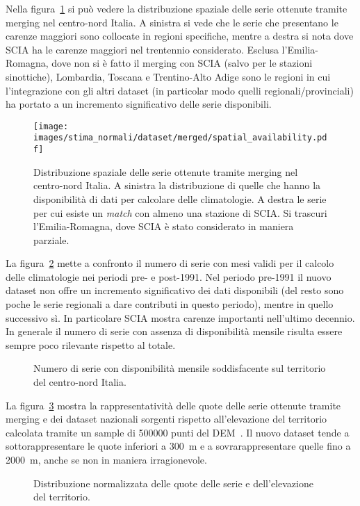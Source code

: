 Nella figura~\ref{fig:merged-series} si può vedere la distribuzione spaziale delle serie ottenute tramite merging nel centro-nord Italia. A sinistra si vede che le serie che presentano le carenze maggiori sono collocate in regioni specifiche, mentre a destra si nota dove SCIA ha le carenze maggiori nel trentennio considerato. Esclusa l'Emilia-Romagna, dove non si è fatto il merging con SCIA (salvo per le stazioni sinottiche), Lombardia, Toscana e Trentino-Alto Adige sono le regioni in cui l'integrazione con gli altri dataset (in particolar modo quelli regionali/provinciali) ha portato a un incremento significativo delle serie disponibili.
\begin{figure}[ht]
  \centering
  \texttt{[image: images/stima\_normali/dataset/merged/spatial\_availability.pdf]}
  \caption{Distribuzione spaziale delle serie ottenute tramite merging nel centro-nord Italia. A sinistra la distribuzione di quelle che hanno la disponibilità di dati per calcolare delle climatologie. A destra le serie per cui esiste un \emph{match} con almeno una stazione di SCIA. Si trascuri l'Emilia-Romagna, dove SCIA è stato considerato in maniera parziale.}\label{fig:merged-series}
\end{figure}

La figura~\ref{fig:merged-timeseries} mette a confronto il numero di serie con mesi validi per il calcolo delle climatologie nei periodi pre- e post-1991. Nel periodo pre-1991 il nuovo dataset non offre un incremento significativo dei dati disponibili (del resto sono poche le serie regionali a dare contributi in questo periodo), mentre in quello successivo sì. In particolare SCIA mostra carenze importanti nell'ultimo decennio. In generale il numero di serie con assenza di disponibilità mensile risulta essere sempre poco rilevante rispetto al totale.
\begin{figure}[ht]
  \centering
  
  \caption{Numero di serie con disponibilità mensile soddisfacente sul territorio del centro-nord Italia.}\label{fig:merged-timeseries}
\end{figure}

La figura~\ref{fig:merged-elevations} mostra la rappresentatività delle quote delle serie ottenute tramite merging e dei dataset nazionali sorgenti rispetto all'elevazione del territorio calcolata tramite un sample di \num{500000} punti del DEM~\cite{europeanspaceagencyCopernicusGlobalEuropean2022}. Il nuovo dataset tende a sottorappresentare le quote inferiori a \qty{300}{\meter} e a sovrarappresentare quelle fino a \qty{2000}{\meter}, anche se non in maniera irragionevole.
\begin{figure}[ht]
  \centering
  
  \caption{Distribuzione normalizzata delle quote delle serie e dell'elevazione del territorio.}\label{fig:merged-elevations}
\end{figure}

